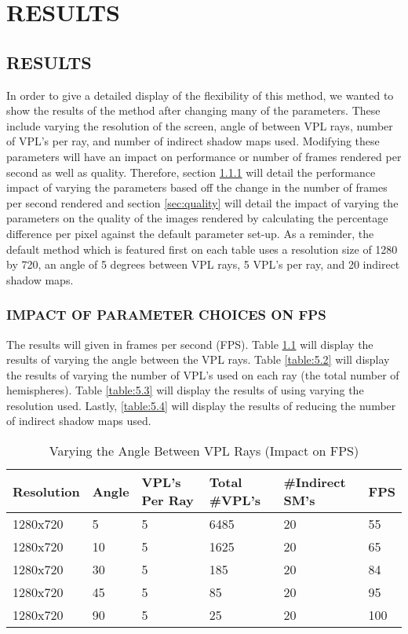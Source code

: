 \chapter{RESULTS}

\section{RESULTS}
In order to give a detailed display of the flexibility of this method, we wanted to show the results of the method after changing many of the parameters.  These include varying the resolution of the screen, angle of between VPL rays, number of VPL's per ray, and number of indirect shadow maps used. Modifying these parameters will have an impact on performance or number of frames rendered per second as well as quality.  Therefore, section \ref{sec:fps} will detail the performance impact of varying the parameters based off the change in the number of frames per second rendered and section \ref{sec:quality} will detail the impact of varying the parameters on the quality of the images rendered by calculating the percentage difference per pixel against the default parameter set-up.  As a reminder, the default method which is featured first on each table uses a resolution size of 1280 by 720, an angle of 5 degrees between VPL rays, 5 VPL's per ray, and 20 indirect shadow maps.

\subsection{IMPACT OF PARAMETER CHOICES ON FPS} \label{sec:fps}
The results will given in frames per second (FPS).  Table \ref{table:5.1} will display the results of varying the angle between the VPL rays. Table \ref{table:5.2} will display the results of varying the number of VPL's used on each ray (the total number of hemispheres). Table \ref{table:5.3} will display the results of using varying the resolution used.  Lastly, \ref{table:5.4} will display the results of reducing the number of indirect shadow maps used.

\begin{table}[h!]
	\caption{Varying the Angle Between VPL Rays (Impact on FPS)}
	\begin{center}
	    \begin{tabular}{ | l | l | l | l | l | l |}
	    \hline
	    Resolution & Angle & VPL's Per Ray & Total \#VPL's & \#Indirect SM's & FPS\\ \hline
	    1280x720 & 5 & 5 & 6485 & 20 & 55\\ \hline
	    1280x720 & 10 & 5 & 1625 & 20 & 65\\ \hline
	    1280x720 & 30 & 5 & 185 & 20 & 84\\ \hline
	    1280x720 & 45 & 5 & 85 & 20 & 95\\ \hline
	    1280x720 & 90 & 5 & 25 & 20 & 100\\ \hline
	    \end{tabular}
	\end{center}
	\label{table:5.1}
\end{table}

